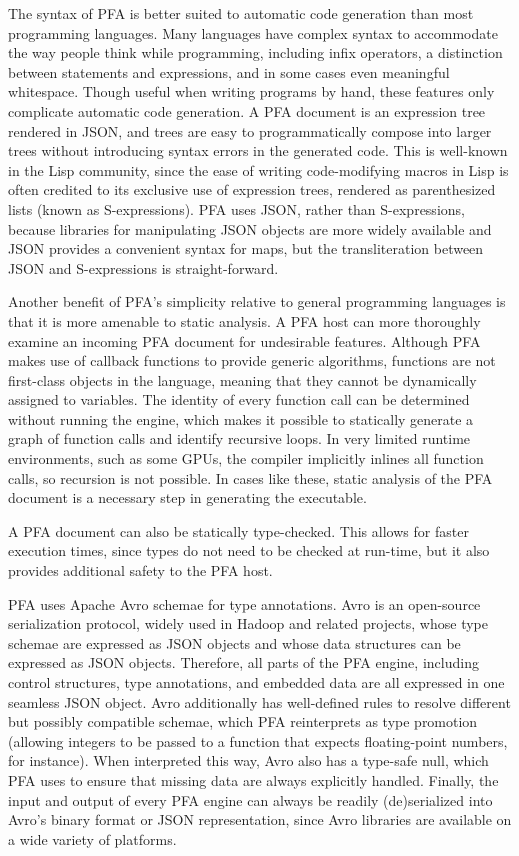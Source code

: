 \documentclass{article}
\theoremstyle{definition}
\begin{document}
The syntax of PFA is better suited to automatic code generation than most programming languages.  Many languages have complex syntax to accommodate the way people think while programming, including infix operators, a distinction between statements and expressions, and in some cases even meaningful whitespace.  Though useful when writing programs by hand, these features only complicate automatic code generation.  A PFA document is an expression tree rendered in JSON, and trees are easy to programmatically compose into larger trees without introducing syntax errors in the generated code.  This is well-known in the Lisp community, since the ease of writing code-modifying macros in Lisp is often credited to its exclusive use of expression trees, rendered as parenthesized lists (known as S-expressions).  PFA uses JSON, rather than S-expressions, because libraries for manipulating JSON objects are more widely available and JSON provides a convenient syntax for maps, but the transliteration between JSON and S-expressions is straight-forward.

Another benefit of PFA's simplicity relative to general programming languages is that it is more amenable to static analysis.  A PFA host can more thoroughly examine an incoming PFA document for undesirable features.  Although PFA makes use of callback functions to provide generic algorithms, functions are not first-class objects in the language, meaning that they cannot be dynamically assigned to variables.  The identity of every function call can be determined without running the engine, which makes it possible to statically generate a graph of function calls and identify recursive loops.  In very limited runtime environments, such as some GPUs, the compiler implicitly inlines all function calls, so recursion is not possible.  In cases like these, static analysis of the PFA document is a necessary step in generating the executable.

A PFA document can also be statically type-checked.  This allows for faster execution times, since types do not need to be checked at run-time, but it also provides additional safety to the PFA host.

PFA uses Apache Avro schemae for type annotations.  Avro is an open-source serialization protocol, widely used in Hadoop and related projects, whose type schemae are expressed as JSON objects and whose data structures can be expressed as JSON objects.  Therefore, all parts of the PFA engine, including control structures, type annotations, and embedded data are all expressed in one seamless JSON object.  Avro additionally has well-defined rules to resolve different but possibly compatible schemae, which PFA reinterprets as type promotion (allowing integers to be passed to a function that expects floating-point numbers, for instance).  When interpreted this way, Avro also has a type-safe null, which PFA uses to ensure that missing data are always explicitly handled.  Finally, the input and output of every PFA engine can always be readily (de)serialized into Avro's binary format or JSON representation, since Avro libraries are available on a wide variety of platforms.
\end{document}
